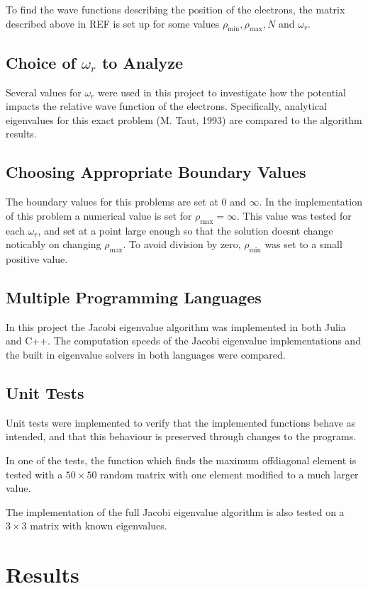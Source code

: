 \documentclass[aps,reprint]{revtex4-1}
\begin{document}
To find the wave functions describing the position of the electrons, the matrix
described above in REF is set up for some values \(\rho_{\text{min}},
\rho_{\text{max}}, N\) and \(\omega_{r}\).
\subsection{Choice of $\omega_r$ to Analyze}
Several values for $\omega_r$ were used in this project to investigate how the
potential impacts the relative wave function of the electrons. Specifically,
analytical eigenvalues for this exact problem (M. Taut, 1993) are compared
to the algorithm results.
\subsection{Choosing Appropriate Boundary Values}
The boundary values for this problems are set at $0$ and \(\infty\). In the
implementation of this problem a numerical value is set for $\rho_\text{max} = \infty$.
This value was tested for each $\omega_r$, and set at a point large enough
so that the solution doesnt change noticably on changing $\rho_\text{max}$.
To avoid division by zero, $\rho_\text{min}$ was set to a small positive value.
\subsection{Multiple Programming Languages}
In this project the Jacobi eigenvalue algorithm was implemented in both Julia and
C++. The computation speeds of the Jacobi eigenvalue implementations
and the built in eigenvalue solvers in both languages were compared.
\subsection{Unit Tests}
Unit tests were implemented to verify that the implemented functions behave
as intended, and that this behaviour is preserved through changes to the programs.

In one of the tests, the function which finds the maximum offdiagonal element
is tested with a $50 \times 50$ random matrix with one element modified to a
much larger value.

The implementation of the full Jacobi eigenvalue algorithm is also tested on a
$3 \times 3$ matrix with known eigenvalues.
\section{Results}
\label{sec:results}
\end{document}
